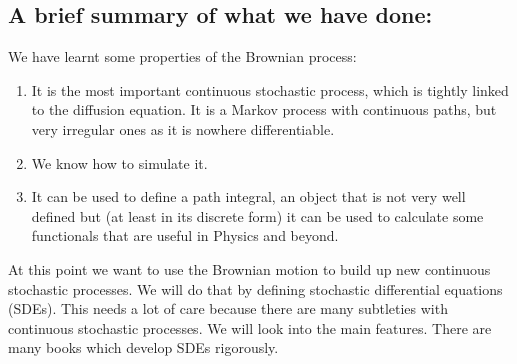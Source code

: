 \subsection*{A brief summary of what we have done:}
We have learnt some properties of the Brownian process:
\begin{enumerate}
  \item It is the most important continuous stochastic process, which is tightly
    linked to the diffusion equation. It is a Markov process with continuous
    paths, but very irregular ones as it is nowhere differentiable.
  \item We know how to simulate it.
  \item It can be used to define a path integral, an object that is not very
    well defined but (at least in its discrete form) it can be used to calculate
    some functionals that are useful in Physics and beyond.
\end{enumerate}

At this point we want to use the Brownian motion to build up new continuous
stochastic processes. We will do that by defining stochastic differential
equations (SDEs). This needs a lot of care because there are many subtleties
with continuous stochastic processes. We will look into the main features. There
are many books which develop SDEs rigorously.
